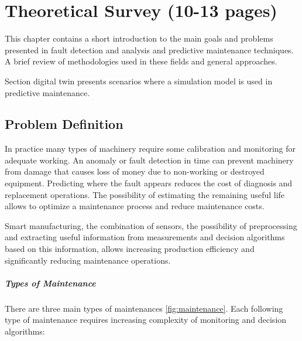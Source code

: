 
\chapter{Theoretical Survey (10-13 pages)}\label{ch:teor_surv}

This chapter contains a short introduction to the main goals and problems
presented in fault detection and analysis and predictive maintenance
techniques. A brief review of methodologies used in these fields and
general approaches.

Section digital twin presents scenarios where a simulation model is used in
predictive maintenance. 


% 

\section{Problem Definition}


In practice many types of machinery require some calibration and monitoring
for adequate working. An anomaly or fault detection in time can prevent
machinery from damage that causes loss of money due to non-working or
destroyed equipment.  Predicting where the fault appears reduces the cost
of diagnosis and replacement operations. The possibility of estimating the
remaining useful life allows to optimize a maintenance process and reduce
maintenance costs.


Smart manufacturing, the combination of sensors, the possibility of
preprocessing and extracting useful information from measurements and
decision algorithms based on this information, allows increasing production
efficiency and significantly reducing maintenance operations.



\paragraph{Types of Maintenance} There are three main types of maintenances
\ref{fig:maintenance}. Each following type of maintenance requires
increasing complexity of monitoring
and decision algorithms:

